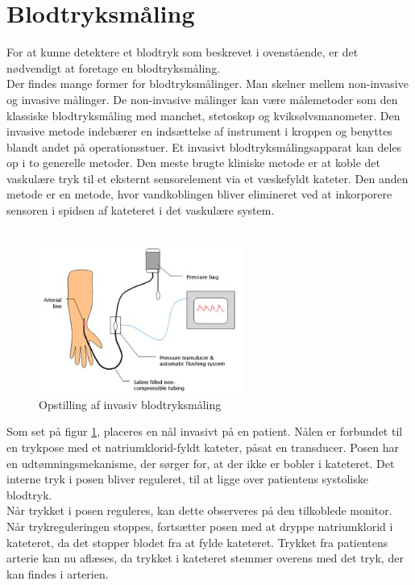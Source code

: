 \section{Blodtryksmåling}
For at kunne detektere et blodtryk som beskrevet i ovenstående, er det nødvendigt at foretage en blodtryksmåling. \\
Der findes mange former for blodtryksmålinger. Man skelner mellem non-invasive og invasive målinger. De non-invasive målinger kan være målemetoder som den klassiske blodtryksmåling med manchet, stetoskop og kviksølvsmanometer. Den invasive metode indebærer en indsættelse af instrument i kroppen og benyttes blandt andet på operationsstuer. Et invasivt blodtryksmålingsapparat kan deles op i to generelle metoder. Den meste brugte kliniske metode er at koble det vaskulære tryk til et eksternt sensorelement via et væskefyldt kateter. Den anden metode er en metode, hvor vandkoblingen bliver elimineret ved at inkorporere sensoren i spidsen af kateteret i det vaskulære system.\\
\\
\begin{figure}[H]
	\centering
	\includegraphics[width=0.6\textwidth]{Figurer/Fysio/tryk}
	\caption{Opstilling af invasiv blodtryksmåling \protect\cite{intramaaling} }
	\label{intramaaling}
\end{figure}

Som set på figur \ref{intramaaling}, placeres en nål invasivt på en patient. Nålen er forbundet til en trykpose med et natriumklorid-fyldt kateter, påsat en transducer. Posen har en udtømningsmekanisme, der sørger for, at der ikke er bobler i kateteret. Det interne tryk i posen bliver reguleret, til at ligge over patientens systoliske blodtryk. \\
Når trykket i posen reguleres, kan dette observeres på den tilkoblede monitor. Når trykreguleringen stoppes, fortsætter posen med at dryppe natriumklorid i kateteret, da det stopper blodet fra at fylde kateteret. Trykket fra patientens arterie kan nu aflæses, da trykket i kateteret stemmer overens med det tryk, der kan findes i arterien. \cite{intramaaling} 

